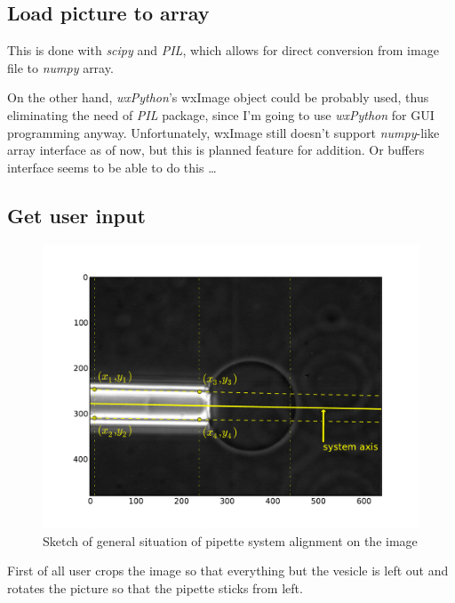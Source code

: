 \subsection{Load picture to array}\label{loadpic}

This is done with \emph{scipy} and \emph{PIL}, which allows for direct conversion from image file to \emph{numpy} array.

On the other hand, \emph{wxPython}'s wxImage object could be probably used, thus eliminating the need of \emph{PIL} package, since I'm going to use \emph{wxPython} for GUI programming anyway. Unfortunately, wxImage still doesn't support \emph{numpy}-like array interface as of now, but this is planned feature for addition. Or buffers interface seems to be able to do this \ldots

\subsection{Get user input}\label{getinput}

\begin{figure}%
\includegraphics[width=\columnwidth]{figs/pipetteaxis.pdf}%
\caption{Sketch of general situation of pipette system alignment on the image}%
\label{fig:pipetteaxis}%
\end{figure}

First of all user crops the image so that everything but the vesicle is left out and rotates the picture so that the pipette sticks from left.

